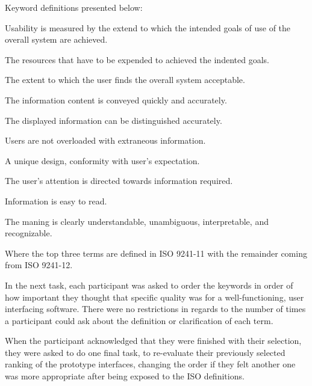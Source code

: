 {    Keyword definitions presented below:

        \begin{description}[style=nextline]
          \item[Effectiveness]{
            Usability is measured by the extend to which the
            intended goals of use of the overall system are achieved.
          }
          \item[Efficiency]{
            The resources that have to be expended to achieved the indented
            goals.
          }
          \item[Satisfaction]{
            The extent to which the user finds the overall system
            acceptable.
          }
          \item[Clarity]{
              The information content is conveyed quickly and accurately.
          }
          \item[Discriminability]{
              The displayed information can be distinguished
              accurately.
          }
          \item[Conciseness]{
              Users are not overloaded with extraneous information.
          }
          \item[Consistency]{
              A unique design, conformity with user's expectation.
          }
          \item[Detectability]{
              The user's attention is directed towards information
              required.
          }
          \item[Legibility]{
              Information is easy to read.
          }
          \item[Comprehensibility]{
              The maning is clearly understandable, unambiguous,
              interpretable, and recognizable.
          }
        \end{description}

    Where the top three terms are defined in ISO 9241-11 with the remainder
    coming from ISO 9241-12.

    In the next task, each participant was asked to order the keywords
    in order of how important they thought that specific quality was for a
    well-functioning, user interfacing software. There were no restrictions
    in regards to the number of times a participant could ask about the
    definition or clarification of each term.

    When the participant acknowledged that they were finished with their
    selection, they were asked to do one final task, to re-evaluate their
    previously selected ranking of the prototype interfaces, changing the order
    if they felt another one was more appropriate after being exposed to the
    ISO definitions.

}

